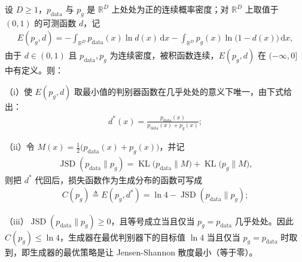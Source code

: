 \documentclass[../../main.tex]{subfiles}
\begin{document}
\begin{proposition}\label{proposition:ch17-最优判别器}
设 $D\geqslant1$，$p_{\mathrm{data}}$ 与 $p_g$ 是 $\mathbb{R}^D$ 上处处为正的连续概率密度；对 $\mathbb{R}^D$ 上取值于 $(0,1)$ 的可测函数 $d$，记
\begin{align*}
E(p_g,d)=-\int_{\mathbb{R}^{D}} p_{\mathrm{data}}(x)\ln d(x)\,\mathrm{d}x-\int_{\mathbb{R}^{D}} p_g(x)\ln\big(1-d(x)\big)\,\mathrm{d}x,
\end{align*}
由于 $d\in(0,1)$ 且 $p_{\mathrm{data}},p_g$ 为连续密度，被积函数连续，$E(p_g,d)$ 在 $(-\infty,0]$ 中有定义。则：

（i）使 $E(p_g,d)$ 取最小值的判别器函数在几乎处处的意义下唯一，由下式给出：
\begin{align}
d^*(x)=\frac{p_{\mathrm{data}}(x)}{p_{\mathrm{data}}(x)+p_g(x)};
\label{align:ch17-最优判别器}
\end{align}

（ii）令 $M(x)=\frac{1}{2}\big(p_{\mathrm{data}}(x)+p_g(x)\big)$，并记
\begin{align*}
\operatorname{JSD}(p_{\mathrm{data}}\|p_g)=\operatorname{KL}\big(p_{\mathrm{data}}\|M\big)+\operatorname{KL}\big(p_g\|M\big),
\end{align*}
则把 $d^*$ 代回后，损失函数作为生成分布的函数可写成
\begin{align}
C(p_g)\triangleq E(p_g,d^*)=\ln 4-\operatorname{JSD}(p_{\mathrm{data}}\|p_g);
\label{align:ch17-JSD}
\end{align}

（iii）$\operatorname{JSD}(p_{\mathrm{data}}\|p_g)\geqslant0$，且等号成立当且仅当 $p_g=p_{\mathrm{data}}$ 几乎处处。因此 $C(p_g)\leqslant\ln 4$，生成器在最优判别器下的目标值 $\ln 4$ 当且仅当 $p_g=p_{\mathrm{data}}$ 时取到，即生成器的最优策略是让 Jensen-Shannon 散度最小（等于零）。
\end{proposition}
\end{document}
